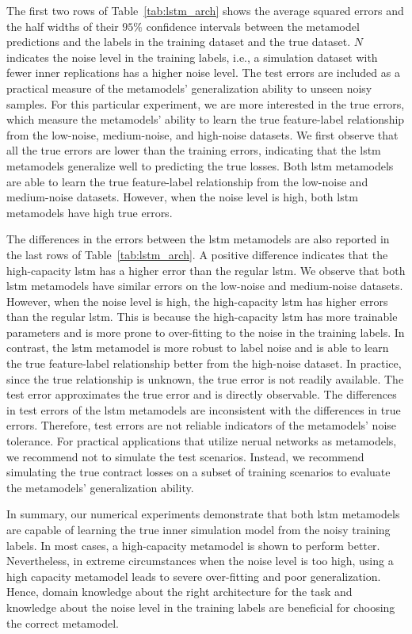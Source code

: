 The first two rows of Table~\ref{tab:lstm_arch} shows the average squared errors and the half widths of their $95\%$ confidence intervals between the metamodel predictions and the labels in the training dataset and the true dataset.
$N$ indicates the noise level in the training labels, i.e., a simulation dataset with fewer inner replications has a higher noise level.
The test errors are included as a practical measure of the metamodels' generalization ability to unseen noisy samples.
For this particular experiment, we are more interested in the true errors, which measure the metamodels' ability to learn the true feature-label relationship from the low-noise, medium-noise, and high-noise datasets.
We first observe that all the true errors are lower than the training errors, indicating that the \gls{lstm} metamodels generalize well to predicting the true losses.
Both \gls{lstm} metamodels are able to learn the true feature-label relationship from the low-noise and medium-noise datasets.
However, when the noise level is high, both \gls{lstm} metamodels have high true errors.

The differences in the errors between the \gls{lstm} metamodels are also reported in the last rows of Table~\ref{tab:lstm_arch}.
A positive difference indicates that the high-capacity \gls{lstm} has a higher error than the regular \gls{lstm}.
We observe that both \gls{lstm} metamodels have similar errors on the low-noise and medium-noise datasets.
However, when the noise level is high, the high-capacity \gls{lstm} has higher errors than the regular \gls{lstm}.
This is because the high-capacity \gls{lstm} has more trainable parameters and is more prone to over-fitting to the noise in the training labels.
In contrast, the \gls{lstm} metamodel is more robust to label noise and is able to learn the true feature-label relationship better from the high-noise dataset.
In practice, since the true relationship is unknown, the true error is not readily available.
The test error approximates the true error and is directly observable.
The differences in test errors of the \gls{lstm} metamodels are inconsistent with the differences in true errors.
Therefore, test errors are not reliable indicators of the metamodels' noise tolerance.
For practical applications that utilize nerual networks as metamodels, we recommend not to simulate the test scenarios.
Instead, we recommend simulating the true contract losses on a subset of training scenarios to evaluate the metamodels' generalization ability.

In summary, our numerical experiments demonstrate that both \gls{lstm} metamodels are capable of learning the true inner simulation model from the noisy training labels.
In most cases, a high-capacity metamodel is shown to perform better.
Nevertheless, in extreme circumstances when the noise level is too high, using a high capacity metamodel leads to severe over-fitting and poor generalization.
Hence, domain knowledge about the right architecture for the task and knowledge about the noise level in the training labels are beneficial for choosing the correct metamodel.

